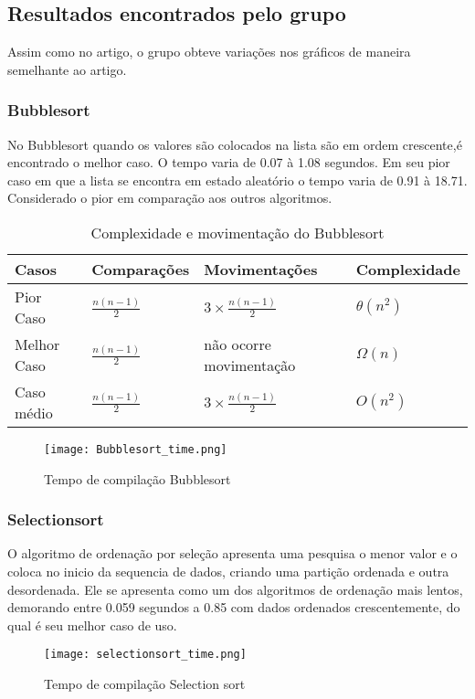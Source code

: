 \documentclass[a4paper.12pt]{article}
\begin{document}
\subsection{Resultados encontrados pelo grupo}


Assim como no artigo, o grupo obteve variações nos gráficos de maneira semelhante ao artigo.


\subsubsection{Bubblesort}
No Bubblesort quando os valores são colocados na lista são em ordem crescente,é encontrado o melhor caso. O tempo varia de 0.07 à 1.08 segundos. Em seu pior caso em que a lista se encontra em estado aleatório o tempo varia de 0.91 à 18.71. Considerado o pior em comparação aos outros algoritmos.
\begin{table}[!ht]
\centering
\caption{Complexidade e movimentação do Bubblesort}
\begin{tabular}{|l|l|l|l|}
\hline
Casos & Comparações & Movimentações & Complexidade\\
\hline
Pior Caso & $\frac{n(n-1)}{2}$ & $3\times\frac{n(n-1)}{2}$ & $\theta(n^2)$\\
\hline
Melhor Caso & $\frac{n(n-1)}{2}$ & não ocorre movimentação & $ \Omega(n)$\\
\hline 
Caso médio & $\frac{n(n-1)}{2}$ & $3\times\frac{n(n-1)}{2}$ & $ O(n^2)$\\
\hline
\end{tabular}
\label{tab01}
\end{table}

\begin{figure}[H]
    \centering
    \texttt{[image: Bubblesort\_time.png]}
    \caption{Tempo de compilação Bubblesort}
    \label{fig:02}
\end{figure}

\subsubsection{Selectionsort}
O algoritmo de ordenação por seleção apresenta uma pesquisa o menor valor e o coloca no inicio da sequencia de dados, criando uma partição ordenada e outra desordenada. Ele se apresenta como um dos algoritmos de ordenação mais lentos, demorando entre 0.059 segundos a 0.85 com dados ordenados crescentemente, do qual é seu melhor caso de uso.\\

\begin{figure}[H]
    \centering
    \texttt{[image: selectionsort\_time.png]}
    \caption{Tempo de compilação Selection sort}
    \label{fig02}
\end{figure}
\end{document}
